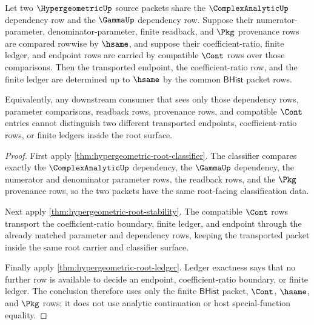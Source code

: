 \begin{theorem}
\label{thm:hypergeometric-endpoint-ledger-determinacy}
Let two $\HypergeometricUp$ source packets share the
$\ComplexAnalyticUp$ dependency row and the $\GammaUp$ dependency row. Suppose
their numerator-parameter, denominator-parameter, finite readback, and
$\Pkg$ provenance rows are compared rowwise by $\hsame$, and suppose their
coefficient-ratio, finite ledger, and endpoint rows are carried by compatible
$\Cont$ rows over those comparisons. Then the transported endpoint, the
coefficient-ratio row, and the finite ledger are determined up to $\hsame$ by
the common $\mathsf{BHist}$ packet rows.

Equivalently, any downstream consumer that sees only those dependency rows,
parameter comparisons, readback rows, provenance rows, and compatible $\Cont$
entries cannot distinguish two different transported endpoints,
coefficient-ratio rows, or finite ledgers inside the root surface.
\end{theorem}
\begin{proof}
First apply \autoref{thm:hypergeometric-root-classifier}. The classifier
compares exactly the $\ComplexAnalyticUp$ dependency, the $\GammaUp$ dependency,
the numerator and denominator parameter rows, the readback rows, and the
$\Pkg$ provenance rows, so the two packets have the same root-facing
classification data.

Next apply \autoref{thm:hypergeometric-root-stability}. The compatible $\Cont$
rows transport the coefficient-ratio boundary, finite ledger, and endpoint
through the already matched parameter and dependency rows, keeping the
transported packet inside the same root carrier and classifier surface.

Finally apply \autoref{thm:hypergeometric-root-ledger}. Ledger exactness says
that no further row is available to decide an endpoint, coefficient-ratio
boundary, or finite ledger. The conclusion therefore uses only the finite
$\mathsf{BHist}$ packet, $\Cont$, $\hsame$, and $\Pkg$ rows; it does not use
analytic continuation or host special-function equality.
\end{proof}

